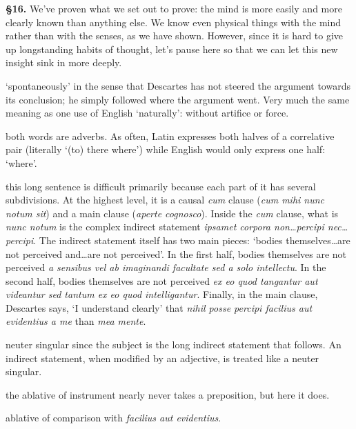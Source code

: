 \textbf{§16.} We've proven what we set out to prove: the mind is more easily and more clearly known than anything else. We know even physical things with the mind rather than with the senses, as we have shown. However, since it is hard to give up longstanding habits of thought, let's pause here so that we can let this new insight sink in more deeply.

 `spontaneously' in the sense that Descartes has not steered the argument towards its conclusion; he simply followed where the argument went. Very much the same meaning as one use of English `naturally': without artifice or force.

 both words are adverbs. As often, Latin expresses both halves of a correlative pair (literally `(to) there where') while English would only express one half: `where'.

 this long sentence is difficult primarily because each part of it has several subdivisions. At the highest level, it is a causal \textit{cum} clause (\textit{cum mihi nunc notum sit}) and a main clause (\textit{aperte cognosco}). Inside the \textit{cum} clause, what is \textit{nunc notum} is the complex indirect statement \textit{ipsamet corpora non\dots percipi nec\dots percipi}. The indirect statement itself has two main pieces: `bodies themselves\dots are not perceived and\dots are not perceived'. In the first half, bodies themselves are not perceived \textit{a sensibus vel ab imaginandi facultate sed a solo intellectu}. In the second half, bodies themselves are not perceived \textit{ex eo quod tangantur aut videantur sed tantum ex eo quod intelligantur}. Finally, in the main clause, Descartes says, `I understand clearly' that \textit{nihil posse percipi facilius aut evidentius a me} than \textit{mea mente}. 

 neuter singular since the subject is the long indirect statement that follows. An indirect statement, when modified by an adjective, is treated like a neuter singular.

 the ablative of instrument nearly never takes a preposition, but here it does.

 ablative of comparison with \textit{facilius aut evidentius}.

